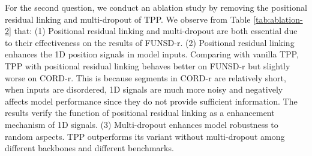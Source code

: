 \documentclass[11pt]{article}
\begin{document}
For the second question, we conduct an ablation study by removing the positional residual linking and multi-dropout of TPP. We observe from Table \ref{tab:ablation-2} that: 
(1) Positional residual linking and multi-dropout are both essential due to their effectiveness on the results of FUNSD-r. 
(2) Positional residual linking enhances the 1D position signals in model inputs. Comparing with vanilla TPP, TPP with positional residual linking behaves better on FUNSD-r but slightly worse on CORD-r. This is because segments in CORD-r are relatively short, when inputs are disordered, 1D signals are much more noisy and negatively affects model performance since they do not provide sufficient information. The results verify the function of positional residual linking as a enhancement mechanism of 1D signals. 
(3) Multi-dropout enhances model robustness to random aspects. TPP outperforms its variant without multi-dropout among different backbones and different benchmarks. 
\end{document}
